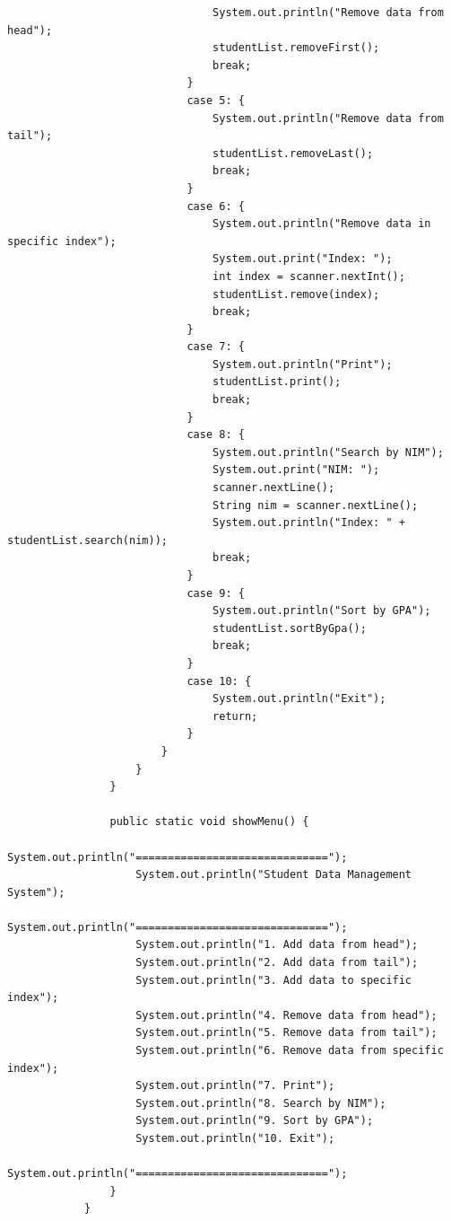 \documentclass[12pt,titlepage]{article}
\begin{document}
\begin{enumerate}
{\begin{verbatim}
                                System.out.println("Remove data from head");
                                studentList.removeFirst();
                                break;
                            }
                            case 5: {
                                System.out.println("Remove data from tail");
                                studentList.removeLast();
                                break;
                            }
                            case 6: {
                                System.out.println("Remove data in specific index");
                                System.out.print("Index: ");
                                int index = scanner.nextInt();
                                studentList.remove(index);
                                break;
                            }
                            case 7: {
                                System.out.println("Print");
                                studentList.print();
                                break;
                            }
                            case 8: {
                                System.out.println("Search by NIM");
                                System.out.print("NIM: ");
                                scanner.nextLine();
                                String nim = scanner.nextLine();
                                System.out.println("Index: " + studentList.search(nim));
                                break;
                            }
                            case 9: {
                                System.out.println("Sort by GPA");
                                studentList.sortByGpa();
                                break;
                            }
                            case 10: {
                                System.out.println("Exit");
                                return;
                            }
                        }
                    }
                }

                public static void showMenu() {
                    System.out.println("==============================");
                    System.out.println("Student Data Management System");
                    System.out.println("==============================");
                    System.out.println("1. Add data from head");
                    System.out.println("2. Add data from tail");
                    System.out.println("3. Add data to specific index");
                    System.out.println("4. Remove data from head");
                    System.out.println("5. Remove data from tail");
                    System.out.println("6. Remove data from specific index");
                    System.out.println("7. Print");
                    System.out.println("8. Search by NIM");
                    System.out.println("9. Sort by GPA");
                    System.out.println("10. Exit");
                    System.out.println("==============================");
                }
            }
        \end{verbatim}
    }
\end{enumerate}
\end{document}

